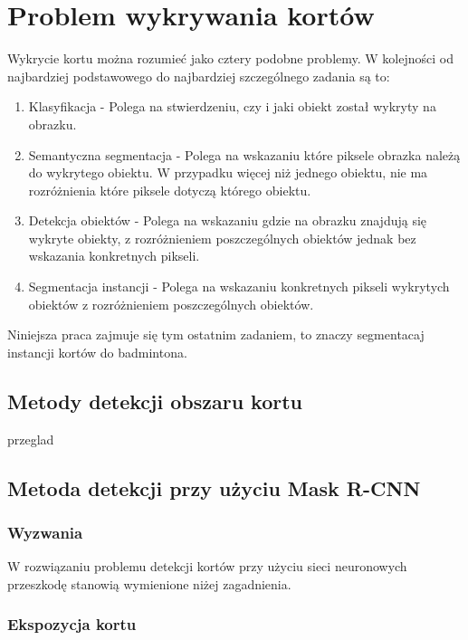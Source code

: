 \chapter{Problem wykrywania kortów}

Wykrycie kortu można rozumieć jako cztery podobne problemy. W kolejności od najbardziej podstawowego do najbardziej szczególnego zadania są to:

\begin{enumerate}
	\item Klasyfikacja - Polega na stwierdzeniu, czy i jaki obiekt został wykryty na obrazku.
	\item Semantyczna segmentacja - Polega na wskazaniu które piksele obrazka należą do wykrytego obiektu. W przypadku więcej niż jednego obiektu, nie ma rozróżnienia które piksele dotyczą którego obiektu.
	\item Detekcja obiektów - Polega na wskazaniu gdzie na obrazku znajdują się wykryte obiekty, z rozróżnieniem poszczególnych obiektów jednak bez wskazania konkretnych pikseli.
	\item Segmentacja instancji - Polega na wskazaniu konkretnych pikseli wykrytych obiektów z rozróżnieniem poszczególnych obiektów.
\end{enumerate}

Niniejsza praca zajmuje się tym ostatnim zadaniem, to znaczy segmentacaj instancji kortów do badmintona.

\section{Metody detekcji obszaru kortu}


{przeglad}

\section{Metoda detekcji przy użyciu Mask R-CNN}

\subsection{Wyzwania}

W rozwiązaniu problemu detekcji kortów przy użyciu sieci neuronowych przeszkodę stanowią wymienione niżej zagadnienia.

\subsection*{Ekspozycja kortu}

